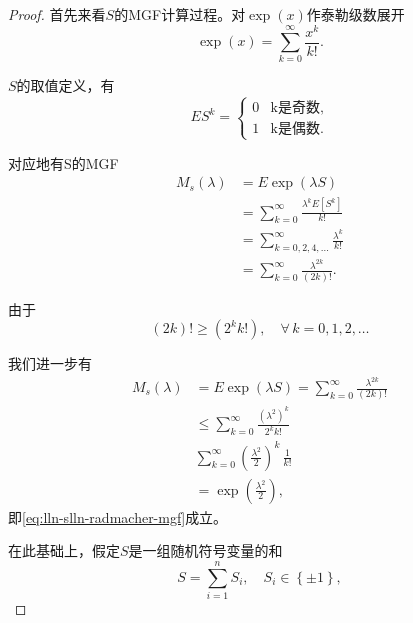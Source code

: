 \begin{proof}
首先来看$S$的MGF计算过程。对$\exp (x)$作泰勒级数展开
\begin{equation*}
  \exp (x) = \sum_{k=0}^{\infty} \frac{x^{k}}{k!}.
\end{equation*}

$S$的取值定义，有
\begin{equation*}
  E S^{k} = \begin{cases}
  0 & \text{k是奇数}, \\
  1 & \text{k是偶数}.
  \end{cases}
\end{equation*}

对应地有S的MGF
\begin{equation*}
  \begin{split}
    M_{s} \left( \lambda \right)
    & = E \exp \left( \lambda S \right) \\
    & = \sum_{k=0}^{\infty} \frac{
    \lambda^{k} E \left[ S^{k} \right]
    }{
    k!
    } \\
    & = \sum_{k=0,2,4,\ldots}^{\infty}
    \frac{\lambda^{k} }{k!} \\
    & = \sum_{k=0}^{\infty} \frac{\lambda^{2k}}{\left(2k\right)!}.
  \end{split}
\end{equation*}

由于
\begin{equation*}
  \left( 2 k \right)! \ge  \left( 2^{k} k! \right), \quad \forall \, k = 0,1,2,\ldots
\end{equation*}

我们进一步有
\begin{equation*}
  \begin{split}
    M_{s} \left( \lambda \right) & = E \exp \left( \lambda S \right) = \sum_{k=0}^{\infty} \frac{\lambda^{2k}}{\left(2k\right)!}\\
    & \le \sum_{k=0}^{\infty}
    \frac{
    \left( \lambda^{2} \right)^{k}
    }{
    2^{k} k!
    } \\
    & \sum_{k=0}^{\infty} \left( \frac{\lambda^{2}}{2} \right)^{k} \, \frac{1}{k!} \\
    & = \exp \left( \frac{\lambda^{2}}{2} \right),
  \end{split}
\end{equation*}
即\eqref{eq:lln-slln-radmacher-mgf}成立。

在此基础上，假定$S$是一组随机符号变量的和
\begin{equation*}
  S = \sum_{i=1}^{n} S_{i}, \quad S_{i} \in \left\{ \pm 1 \right\},
\end{equation*}


\end{proof}
